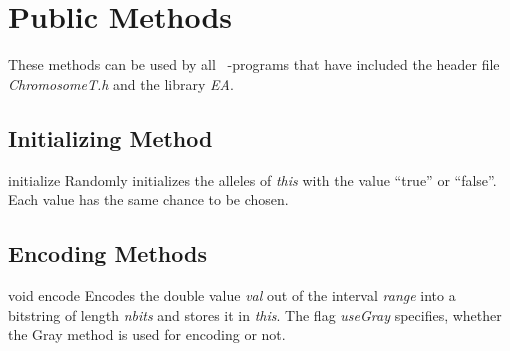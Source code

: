 \section{Public Methods}

These methods can be used by all \cpp\ -programs that have included
the header file {\em ChromosomeT.h} and the library {\em EA}.

\subsection{Initializing Method}

\setNormalInstance
\printEmptyMethod
{initialize}
{Randomly initializes the alleles of {\em this} with the
 value ``true'' or ``false''. Each value has the same chance
 to be chosen.}

\clearpage

\subsection{Encoding Methods}

\setNormalInstance
\setCorrectWidthThree{8pt}
\printMethodWithParamsSaved
{void}
{}
{encode}
{Encodes the double value {\em val} out of the interval {\em range} into
 a bitstring of length {\em nbits} and stores it in {\em this}.
 The flag {\em useGray} specifies, whether the Gray method is used
 for encoding or not.}
{}
\setCorrectWidthThree{4pt}

\vspace*{4ex}

